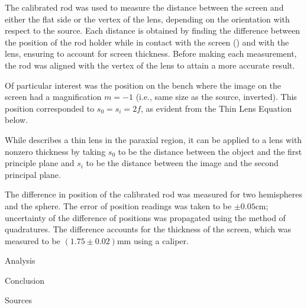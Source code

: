 \begin{paper}
	The calibrated rod was used to measure the distance between the screen and either the flat side or the vertex of the lens, depending on the orientation with respect to the source. Each distance is obtained by finding the difference between the position of the rod holder while in contact with the screen (\figSetup) and with the lens, ensuring to account for screen thickness. Before making each measurement, the rod was aligned with the vertex of the lens to attain a more accurate result.
	
	Of particular interest was the position on the bench where the image on the screen had a magnification \( m = -1 \) (i.e., same size as the source, inverted). This position corresponded to \( s_0 = s_i = 2f \), as evident from the Thin Lens Equation below.
	\begin{paperwhere}
	\end{paperwhere}

	While \eqThinLensEquation describes a thin lens in the paraxial region, it can be applied to a lens with nonzero thickness by taking \( s_0 \) to be the distance between the object and the first principle plane and \( s_i \) to be the distance between the image and the second principal plane.
	

	The difference in position of the calibrated rod was measured for two hemispheres and the sphere. The error of position readings was taken to be \( \pm 0.05 \si{\cm} \); uncertainty of the difference of positions was propagated using the method of quadratures. The difference accounts for the thickness of the screen, which was measured to be \( (1.75 \pm 0.02) \si{\mm} \) using a caliper.


	
	Analysis
	

		Conclusion 


	Sources

\end{paper}

